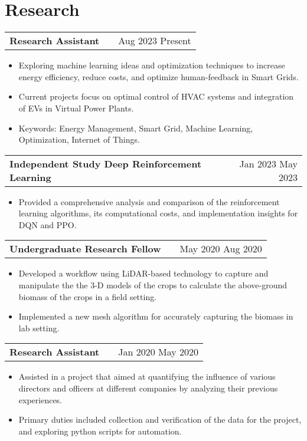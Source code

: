 \documentclass[a4paper,12pt]{article}
\makeatletter
\newenvironment{joblong}[2]
    {
    \begin{tabularx}{\linewidth}{@{}l X r@{}}
    \textbf{#1} & \hfill &  #2 \\[3.75pt]
    \end{tabularx}
    \begin{minipage}[t]{\linewidth}
    \begin{itemize}[nosep,after=\strut, leftmargin=1em, itemsep=3pt,label=--]
    }
    {
    \end{itemize}
    \end{minipage}    
    }
\makeatother
\begin{document}

\section{Research}

\begin{joblong}{Research Assistant}{Aug 2023 Present} %
\item Exploring machine learning ideas and optimization techniques to increase energy efficiency, reduce costs, and optimize human-feedback in Smart Grids. %
\item Current projects focus on optimal control of HVAC systems and integration of EVs in Virtual Power Plants. %
\item Keywords: Energy Management, Smart Grid, Machine Learning, Optimization, Internet of Things. %
\end{joblong}

\begin{joblong}{Independent Study Deep Reinforcement Learning}{Jan 2023 May 2023} %
\item Provided a comprehensive analysis and comparison of the reinforcement learning algorithms, its computational costs, and implementation insights for DQN and PPO. %
\end{joblong}

\begin{joblong}{Undergraduate Research Fellow}{May 2020 Aug 2020} %
\item Developed a workflow using LiDAR-based technology to capture and manipulate the the 3-D models of the crops to calculate the above-ground biomass of the crops in a field setting. %
\item Implemented a new mesh algorithm for accurately capturing the biomass in lab setting. %
\end{joblong}
  
\begin{joblong}{Research Assistant}{Jan 2020 May 2020} %
\item Assisted in a project that aimed at quantifying the influence of various directors and officers at different companies by analyzing their previous experiences. %
\item Primary duties included collection and verification of the data for the project, and exploring python scripts for automation. %
\end{joblong}
\end{document}
